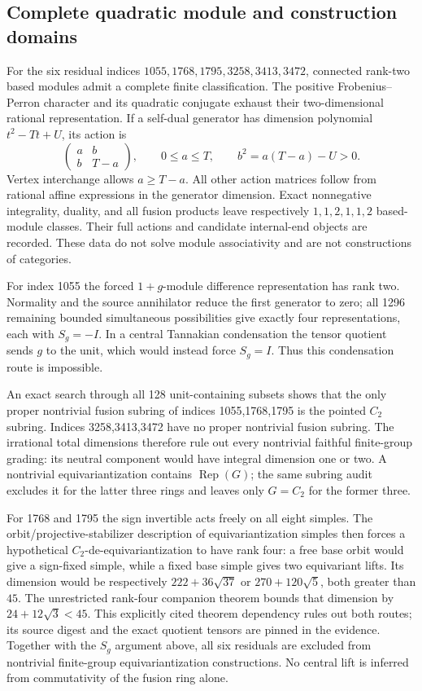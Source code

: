 \subsection{Complete quadratic module and construction domains}

For the six residual indices $1055,1768,1795,3258,3413,3472$, connected
rank-two based modules admit a complete finite classification. The
positive Frobenius--Perron character and its quadratic conjugate exhaust
their two-dimensional rational representation. If a self-dual generator
has dimension polynomial $t^2-Tt+U$, its action is
\[
 \begin{pmatrix}a&b\\b&T-a\end{pmatrix},\qquad
 0\leq a\leq T,\qquad b^2=a(T-a)-U>0.
\]
Vertex interchange allows $a\geq T-a$. All other action matrices follow
from rational affine expressions in the generator dimension. Exact
nonnegative integrality, duality, and all fusion products leave respectively
$1,1,2,1,1,2$ based-module classes. Their full actions and candidate
internal-end objects are recorded. These data do not solve module
associativity and are not constructions of categories.

For index 1055 the forced $1+g$-module difference representation has rank
two. Normality and the source annihilator reduce the first generator to
zero; all 1296 remaining bounded simultaneous possibilities give exactly
four representations, each with $S_g=-I$. In a central Tannakian
condensation the tensor quotient sends $g$ to the unit, which would instead
force $S_g=I$. Thus this condensation route is impossible.

An exact search through all 128 unit-containing subsets shows that the
only proper nontrivial fusion subring of indices 1055,1768,1795 is the
pointed $C_2$ subring. Indices 3258,3413,3472 have no proper nontrivial
fusion subring. The irrational total dimensions therefore rule out every
nontrivial faithful finite-group grading: its neutral component would
have integral dimension one or two. A nontrivial equivariantization
contains $\operatorname{Rep}(G)$; the same subring audit excludes it for
the latter three rings and leaves only $G=C_2$ for the former three.

For 1768 and 1795 the sign invertible acts freely on all eight simples.
The orbit/projective-stabilizer description of equivariantization simples
then forces a hypothetical $C_2$-de-equivariantization to have rank four:
a free base orbit would give a sign-fixed simple, while a fixed base simple
gives two equivariant lifts. Its dimension would be respectively
$222+36\sqrt{37}$ or $270+120\sqrt5$, both greater than $45$.
The unrestricted rank-four companion theorem bounds that dimension by
$24+12\sqrt3<45$. This explicitly cited theorem dependency rules out both
routes; its source digest and the exact quotient tensors are pinned in
the evidence. Together with the $S_g$ argument above, all six residuals
are excluded from nontrivial finite-group equivariantization constructions.
No central lift is inferred from commutativity of the fusion ring alone.

